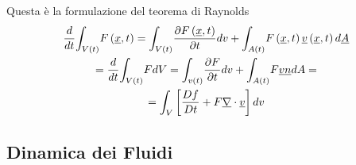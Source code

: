 Questa è la formulazione del teorema di Raynolds
\begin{gather*}
  \frac{d}{dt} \displaystyle{\int_{V\left( t\right) }^{}}F\left( \underline{x},t\right) =
  \displaystyle{\int_{V\left( t\right) }^{}} \frac{\partial F\left(\underline{x},t\right)  }{\partial t}dv + \displaystyle{\int_{A\left( t\right) }^{}}F\left( \underline{x},t\right) \underline{v}\left( \underline{x},t\right) d \underline{A}\\
  =\frac{d}{dt} \displaystyle{\int_{V\left( t\right) }^{}}FdV = \displaystyle{\int_{v\left( t\right) }^{}} \frac{\partial F}{\partial t}dv +\displaystyle{\int_{A\left( t\right) }^{}}F \underline{v} \underline{n}dA=\\
   = \displaystyle{\int_{V}^{}} \left[ \frac{Df}{Dt} + F \underline{\nabla} \cdot \underline{v}\right] dv
\end{gather*}
\begin{figure}[H]
    \centering
    \label{fig:volume_ovale}
\end{figure}
\subsection{Dinamica dei Fluidi}

